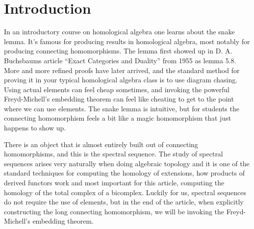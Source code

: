 \section{Introduction}

In an introductory course on homological algebra one learns about the snake lemma. It's famous for producing results in homological algebra, most notably for producing connecting homomorphisms. The lemma first showed up in D. A. Buchsbaums article ``Exact Categories and Duality'' from 1955 as lemma 5.8. More and more refined proofs have later arrived, and the standard method for proving it in your typical homological algebra class is to use diagram chasing. Using actual elements can feel cheap sometimes, and invoking the powerful Freyd-Michell's embedding theorem can feel like cheating to get to the point where we can use elements. The snake lemma is intuitive, but for students the connecting homomorphism feels a bit like a magic homomorphism that just happens to show up. 

There is an object that is almost entirely built out of connecting homomorphisms, and this is the spectral sequence. The study of spectral sequences arises very naturally when doing algebraic topology and it is one of the standard techniques for computing the homology of extensions, how products of derived functors work and most important for this article, computing the homology of the total complex of a bicomplex. Luckily for us, spectral sequences do not require the use of elements, but in the end of the article, when explicitly constructing the long connecting homomorphism, we will be invoking the Freyd-Michell's embedding theorem.
